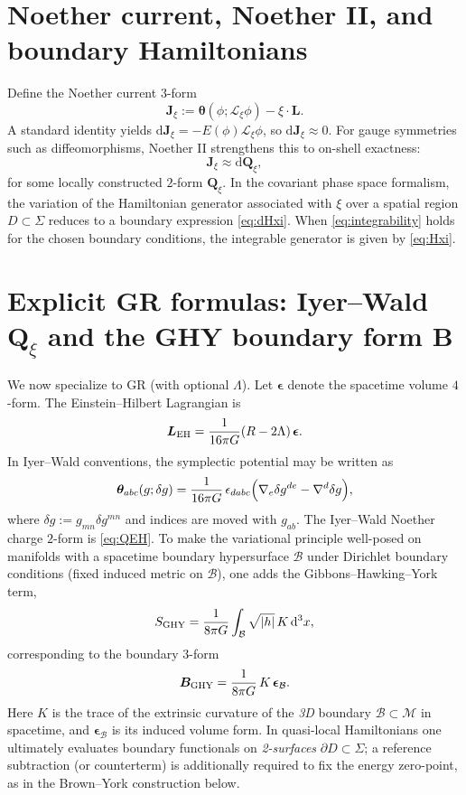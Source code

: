 \documentclass[
  reprint,
  amsmath,amssymb,
  aps,
  prd,
  superscriptaddress,
  nofootinbib,
  longbibliography
]{revtex4-2}
\newcommand{\dd}{\mathrm{d}}
\newcommand{\M}{\mathcal{M}}
\newcommand{\Lie}{\mathcal{L}}
\newcommand{\on}{\approx}
\newcommand{\Lform}{\bm{L}}
\newcommand{\tht}{\bm{\theta}}
\newcommand{\J}{\bm{J}}
\newcommand{\Q}{\bm{Q}}
\newcommand{\Bnd}{\bm{B}}
\newcommand{\eps}{\bm{\epsilon}}
\begin{document}
\section{Noether current, Noether II, and boundary Hamiltonians}
Define the Noether current $3$-form
\begin{equation}
\J_\xi := \tht(\phi;\Lie_\xi\phi)-\xi\cdot\Lform.
\end{equation}
A standard identity yields $\dd\J_\xi=-E(\phi)\Lie_\xi\phi$, so $\dd\J_\xi\on 0$.
For gauge symmetries such as diffeomorphisms, Noether II strengthens this to on-shell exactness:
\begin{equation}
\J_\xi \on \dd\Q_\xi,
\end{equation}
for some locally constructed $2$-form $\Q_\xi$.
In the covariant phase space formalism, the variation of the Hamiltonian generator associated with $\xi$ over a spatial region $D\subset\Sigma$ reduces to a boundary expression \eqref{eq:dHxi}.
When \eqref{eq:integrability} holds for the chosen boundary conditions, the integrable generator is given by \eqref{eq:Hxi}.
\section{Explicit GR formulas: Iyer--Wald \texorpdfstring{$\Q_\xi$}{Q_xi} and the GHY boundary form \texorpdfstring{$\Bnd$}{B}}
We now specialize to GR (with optional $\Lambda$). Let $\eps$ denote the spacetime volume $4$-form. The Einstein--Hilbert Lagrangian is
\begin{equation}
\Lform_{\rm EH}=\frac{1}{16\pi G}(R-2\Lambda)\,\eps.
\end{equation}
In Iyer--Wald conventions, the symplectic potential may be written as
\begin{equation}
\tht_{abc}(g;\delta g)=\frac{1}{16\pi G}\,\epsilon_{dabc}\Bigl(\nabla_e\delta g^{de}-\nabla^d\delta g\Bigr),
\end{equation}
where $\delta g := g_{mn}\delta g^{mn}$ and indices are moved with $g_{ab}$.
The Iyer--Wald Noether charge $2$-form is \eqref{eq:QEH}.
To make the variational principle well-posed on manifolds with a spacetime boundary hypersurface $\mathcal{B}$ under Dirichlet boundary conditions (fixed induced metric on $\mathcal{B}$), one adds the Gibbons--Hawking--York term,\cite{GibbonsHawking1977,York1972}
\begin{equation}
S_{\rm GHY}=\frac{1}{8\pi G}\int_{\mathcal B}\sqrt{|h|}\,K\,\dd^3x,
\end{equation}
corresponding to the boundary $3$-form
\begin{equation}
\Bnd_{\rm GHY}=\frac{1}{8\pi G}\,K\,\eps_{\mathcal B}.
\end{equation}
Here $K$ is the trace of the extrinsic curvature of the \emph{3D} boundary $\mathcal{B}\subset\M$ in spacetime, and $\eps_{\mathcal B}$ is its induced volume form.
In quasi-local Hamiltonians one ultimately evaluates boundary functionals on \emph{2-surfaces} $\partial D\subset\Sigma$; a reference subtraction (or counterterm) is additionally required to fix the energy zero-point, as in the Brown--York construction below.
\end{document}
